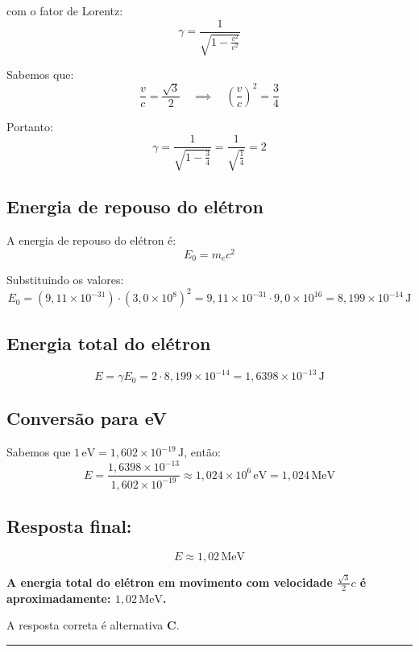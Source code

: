 \documentclass[a4paper,12pt]{article}
\begin{document}
\begin{flushleft}
com o fator de Lorentz:
\[
\gamma = \frac{1}{\sqrt{1 - \frac{v^2}{c^2}}}
\]

Sabemos que:
\[
\frac{v}{c} = \frac{\sqrt{3}}{2} \quad \implies \quad \left( \frac{v}{c} \right)^2 = \frac{3}{4}
\]

Portanto:
\[
\gamma = \frac{1}{\sqrt{1 - \frac{3}{4}}} =
\frac{1}{\sqrt{\frac{1}{4}}} =
2
\]

\subsection*{Energia de repouso do elétron}

A energia de repouso do elétron é:
\[
E_0 = m_e c^2
\]

Substituindo os valores:
\[
E_0 =
\left( 9{,}11 \times 10^{-31} \right) \cdot
\left( 3{,}0 \times 10^8 \right)^2 =
9{,}11 \times 10^{-31} \cdot 9{,}0 \times 10^{16} =
8{,}199 \times 10^{-14}\, \mathrm{J}
\]

\subsection*{Energia total do elétron}

\[
E = \gamma E_0 =
2 \cdot 8{,}199 \times 10^{-14} =
1{,}6398 \times 10^{-13}\, \mathrm{J}
\]

\subsection*{Conversão para eV}

Sabemos que \(1\,\mathrm{eV} = 1{,}602 \times 10^{-19}\, \mathrm{J}\), então:
\[
E =
\frac{1{,}6398 \times 10^{-13}}{1{,}602 \times 10^{-19}} \approx
1{,}024 \times 10^6\, \mathrm{eV} =
1{,}024\,\mathrm{MeV}
\]

\subsection*{Resposta final:}

\[
\boxed{
E \approx 1{,}02\, \mathrm{MeV}
}
\]

\textbf{A energia total do elétron em movimento com velocidade \( \frac{\sqrt{3}}{2}c \) é aproximadamente: \(1{,}02\,\mathrm{MeV}\).}

A resposta correta é alternativa \colorbox{green!50}{\textbf{C}}.
\end{flushleft}

\noindent\rule{\linewidth}{0.6pt}\\
\end{document}
